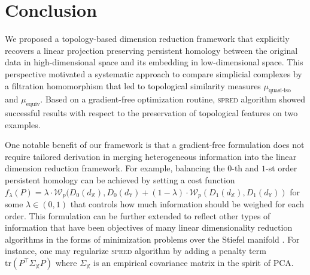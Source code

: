 \documentclass[11pt]{article}
\newcommand{\bbX}{\mathbb{X}}
\begin{document}
\section{Conclusion}\label{sec:conclusion}


We proposed a topology-based dimension reduction framework that explicitly recovers a linear projection preserving persistent homology between the original data in high-dimensional space and its embedding in low-dimensional space. This perspective motivated a systematic approach to compare simplicial complexes by a filtration homomorphism that led to topological similarity measures $\mu_{\operatorname{quasi-iso}}$ and $\mu_{\operatorname{equiv}}$. Based on a gradient-free optimization routine, \textsc{spred} algorithm showed successful results with respect to the preservation of topological features on two examples. 


One notable benefit of our framework is that a gradient-free formulation does not require tailored derivation in merging heterogeneous information into the linear dimension reduction framework. For example, balancing the $0$-th and $1$-st order persistent homology can be achieved by setting a cost function $f_{\lambda}(P) = \lambda \cdot \mathcal{W}_p (D_0 (d_\bbX), D_0 (d_\mathbb{Y}) + (1-\lambda) \cdot \mathcal{W}_p (D_1 (d_\bbX), D_1 (d_\mathbb{Y}))$ for some $\lambda \in (0,1)$ that controls how much information should be weighed for each order. This formulation can be further extended to reflect other types of information that have been objectives of many linear dimensionality reduction algorithms in the forms of minimization problems over the Stiefel manifold \citep{cunningham_linear_2015}. For instance, one may regularize \textsc{spred} algorithm by adding a penalty term $\text{tr}(P^\top \Sigma_\bbX P)$ where $\Sigma_{\bbX}$ is an empirical covariance matrix in the spirit of PCA. 
\end{document}
